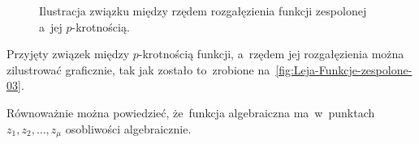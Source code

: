\documentclass[a4paper,11pt]{article}
\numberwithin{equation}{section}
\begin{document}
\begin{figure}[h]

  \centering

  \label{fig:Leja-Funkcje-zespolone-03}


  \caption{Ilustracja związku między rzędem rozgałęzienia funkcji
    zespolonej a~jej $p$-krotnością.}


\end{figure}





\noindent
{} Przyjęty związek między $p$-krotnością funkcji, a~rzędem jej
rozgałęzienia można zilustrować graficznie, tak jak zostało to~zrobione
na~\eqref{fig:Leja-Funkcje-zespolone-03}.

\VerSpaceFour





\noindent
{}

\VerSpaceFour





\noindent
{} Równoważnie można powiedzieć, że~funkcja algebraiczna
ma~w~punktach $z_{ 1 }, z_{ 2 }, \ldots, z_{ \mu }$ osobliwości algebraicznie.
\end{document}
